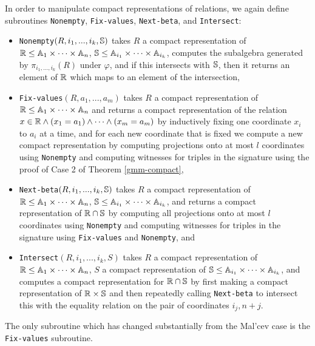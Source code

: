 \documentclass[letterpaper,11pt]{article}
\begin{document}
In order to manipulate compact representations of relations, we again define subroutines \texttt{Nonempty}, \texttt{Fix-values}, \texttt{Next-beta}, and \texttt{Intersect}:
\begin{itemize}
\item \texttt{Nonempty}$(R, i_1, ..., i_k, \mathbb{S})$ takes $R$ a compact representation of $\mathbb{R} \le \mathbb{A}_1\times \cdots\times \mathbb{A}_n$, $\mathbb{S} \le \mathbb{A}_{i_1} \times \cdots \times \mathbb{A}_{i_k}$, computes the subalgebra generated by $\pi_{i_1, ..., i_k}(R)$ under $\varphi$, and if this intersects with $\mathbb{S}$, then it returns an element of $\mathbb{R}$ which maps to an element of the intersection,

\item \texttt{Fix-values}$(R, a_1, ..., a_m)$ takes $R$ a compact representation of $\mathbb{R} \le \mathbb{A}_1\times \cdots\times \mathbb{A}_n$ and returns a compact representation of the relation $x \in \mathbb{R} \wedge (x_1 = a_1) \wedge \cdots \wedge (x_m = a_m)$ by inductively fixing one coordinate $x_i$ to $a_i$ at a time, and for each new coordinate that is fixed we compute a new compact representation by computing projections onto at most $l$ coordinates using \texttt{Nonempty} and computing witnesses for triples in the signature using the proof of Case 2 of Theorem \ref{gmm-compact},

\item \texttt{Next-beta}$(R, i_1, ..., i_k, \mathbb{S})$ takes $R$ a compact representation of $\mathbb{R} \le \mathbb{A}_1\times \cdots\times \mathbb{A}_n$, $\mathbb{S} \le \mathbb{A}_{i_1} \times \cdots \times \mathbb{A}_{i_k}$, and returns a compact representation of $\mathbb{R} \cap \mathbb{S}$ by computing all projections onto at most $l$ coordinates using \texttt{Nonempty} and computing witnesses for triples in the signature using \texttt{Fix-values} and \texttt{Nonempty}, and

\item \texttt{Intersect}$(R, i_1, ..., i_k, S)$ takes $R$ a compact representation of $\mathbb{R} \le \mathbb{A}_1\times \cdots\times \mathbb{A}_n$, $S$ a compact representation of $\mathbb{S} \le \mathbb{A}_{i_1} \times \cdots \times \mathbb{A}_{i_k}$, and computes a compact representation for $\mathbb{R}\cap \mathbb{S}$ by first making a compact representation of $\mathbb{R}\times \mathbb{S}$ and then repeatedly calling \texttt{Next-beta} to intersect this with the equality relation on the pair of coordinates $i_j,n+j$.
\end{itemize}

The only subroutine which has changed substantially from the Mal'cev case is the \texttt{Fix-values} subroutine.
\end{document}
